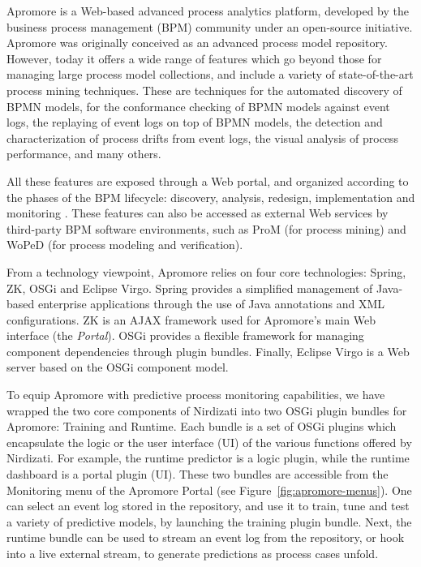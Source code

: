 Apromore is a Web-based advanced process analytics platform, developed by the business process management (BPM) community under an open-source initiative. Apromore was originally conceived as an advanced process model repository. However, today it offers a wide range of features which go beyond those for managing large process model collections, and include a variety of state-of-the-art process mining techniques. These are techniques for the automated discovery of BPMN models, for the conformance checking of BPMN models against event logs, the replaying of event logs on top of BPMN models, the detection and characterization of process drifts from event logs, the visual analysis of process performance, and many others. 

All these features are exposed through a Web portal, and organized according to the phases of the BPM lifecycle: discovery, analysis, redesign, implementation and monitoring \cite{Dumas2018}. These features can also be accessed as external Web services by third-party BPM software environments, such as ProM (for process mining) and WoPeD (for process modeling and verification).

From a technology viewpoint, Apromore relies on four core technologies: Spring, ZK, OSGi and Eclipse Virgo. Spring provides a simplified management of Java-based enterprise applications through the use of Java annotations and XML configurations. ZK is an AJAX framework used for Apromore's main Web interface (the \emph{Portal}). OSGi provides a flexible framework for managing component dependencies through plugin bundles. Finally, Eclipse Virgo is a Web server based on the OSGi component model.

To equip Apromore with predictive process monitoring capabilities, we have wrapped the two core components of Nirdizati into two OSGi plugin bundles for Apromore: Training and Runtime. Each bundle is a set of OSGi plugins which encapsulate the logic or the user interface (UI) of the various functions offered by Nirdizati. For example, the runtime predictor is a logic plugin, while the runtime dashboard is a portal plugin (UI). These two bundles are accessible from the Monitoring menu of the Apromore Portal (see Figure~\ref{fig:apromore-menus}). One can select an event log stored in the repository, and use it to train, tune and test a variety of predictive models, by launching the training plugin bundle. Next, the runtime bundle can be used to stream an event log from the repository, or hook into a live external stream, to generate predictions as process cases unfold.    

